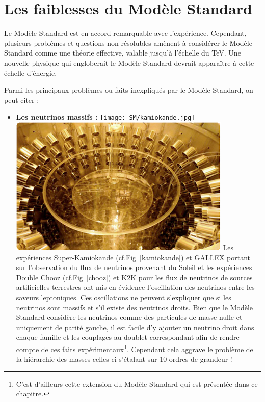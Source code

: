 \section{Les faiblesses du Modèle Standard}
\vspace*{-0.5cm}
Le Modèle Standard est en accord remarquable avec l'expérience. Cependant, plusieurs problèmes et questions non résolubles amènent à considérer le Modèle Standard comme une théorie effective, valable jusqu'à l'échelle du \si{\tera\eV}. Une nouvelle physique qui engloberait le Modèle Standard devrait apparaître à cette échelle d'énergie.

Parmi les principaux problèmes ou faits inexpliqués par le Modèle Standard, on peut citer :
\begin{itemize}[label=$\bullet$]
\item \textbf{Les neutrinos massifs :}
\marginpar
{
\centering
\texttt{[image: SM/kamiokande.jpg]}
\label{kamiokande}
}
\marginpar
{
\centering
\includegraphics[width=\marginparwidth]{SM/chooz.jpg}
\label{chooz}
} 
Les expériences Super-Kamiokande (cf.Fig~\ref{kamiokande}) et GALLEX portant sur l'observation du flux de neutrinos provenant du Soleil et les expériences Double Chooz (cf.Fig~\ref{chooz}) et K2K pour les flux de neutrinos de sources artificielles terrestres ont mis en évidence l'oscillation des neutrinos entre les saveurs leptoniques. Ces oscillations ne peuvent s'expliquer que si les neutrinos sont massifs et s'il existe des neutrinos droits. Bien que le Modèle Standard considère les neutrinos comme des particules de masse nulle et uniquement de parité gauche, il est facile d'y ajouter un neutrino droit dans chaque famille et les couplages au doublet  correspondant afin de rendre compte de ces faits expérimentaux\footnote{C'est d'ailleurs cette extension du Modèle Standard qui est présentée dans ce chapitre.}. Cependant cela aggrave le problème de la hiérarchie des masses celles-ci s'étalant sur \num{10} ordres de grandeur !


\end{itemize}
